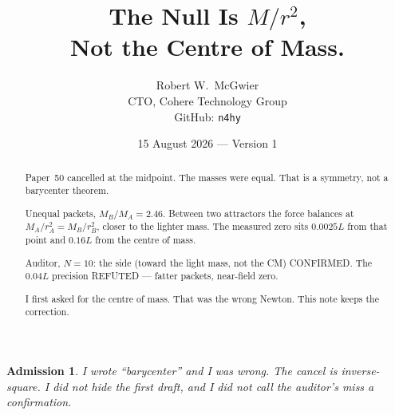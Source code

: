 \documentclass[11pt]{article}
\title{\textbf{The Null Is $M/r^2$,\\
Not the Centre of Mass.}}
\author{Robert W.\ McGwier\\
\small CTO, Cohere Technology Group\\
\small GitHub: \texttt{n4hy}}
\date{15 August 2026 --- Version 1}
\newtheorem*{admission}{Admission}
\begin{document}
\maketitle

\begin{abstract}
\noindent
Paper~50 cancelled at the midpoint. The masses were
equal. That is a symmetry, not a barycenter theorem.

Unequal packets, $M_B/M_A=2.46$. Between two attractors
the force balances at $M_A/r_A^2=M_B/r_B^2$, closer to
the lighter mass. The measured zero sits $0.0025L$ from
that point and $0.16L$ from the centre of mass.

Auditor, $N=10$: the side (toward the light mass, not
the CM) CONFIRMED. The $0.04L$ precision REFUTED ---
fatter packets, near-field zero.

I first asked for the centre of mass. That was the
wrong Newton. This note keeps the correction.
\end{abstract}

\begin{admission}
I wrote ``barycenter'' and I was wrong. The cancel is
inverse-square. I did not hide the first draft, and I
did not call the auditor's miss a confirmation.
\end{admission}
\end{document}
